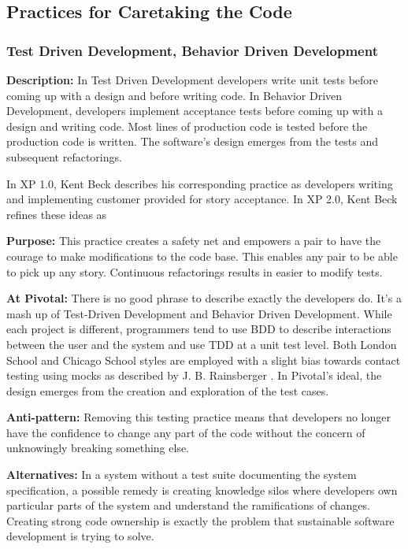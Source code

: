 \begin{table}[]
\subsection{Practices for Caretaking the Code}
\subsubsection{Test Driven Development, Behavior Driven Development}
\textbf{Description:} In Test Driven Development developers write unit tests before coming up with a design and before writing code. In Behavior Driven Development, developers implement acceptance tests before coming up with a design and writing code.  Most lines of production code is tested before the production code is written. The software's design emerges from the tests and subsequent refactorings.

In XP 1.0, Kent Beck describes his corresponding  practice as developers writing  and implementing customer provided  for story acceptance. In XP 2.0, Kent Beck refines these ideas as  

\textbf{Purpose:} This practice creates a safety net and empowers a pair to have the courage to make modifications to the code base. This enables any pair to be able to pick up any story. Continuous refactorings results in easier to modify tests.

\textbf{At Pivotal:} There is no good phrase to describe exactly the developers do. It's a mash up of Test-Driven Development and Behavior Driven Development. While each project is different, programmers tend to use BDD to describe interactions between the user and the system and use TDD at a unit test level. Both London School and Chicago School styles are employed with a slight bias towards contact testing using mocks as described by J. B. Rainsberger \cite{RainsbergerIntegrationTestsYouTube}. In Pivotal's ideal, the design emerges from the creation and exploration of the test cases.  

\textbf{Anti-pattern:} Removing this testing practice means that developers no longer have the confidence to change any part of the code without the concern of unknowingly breaking something else. 

\textbf{Alternatives:} In a system without a test suite documenting the system specification, a possible remedy is creating knowledge silos where developers own particular parts of the system and understand the ramifications of changes. Creating strong code ownership is exactly the problem that sustainable software development is trying to solve.


\end{table}
